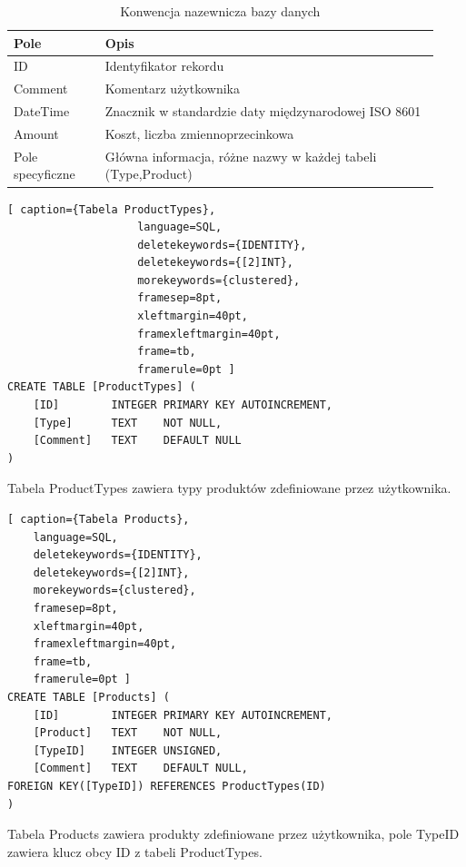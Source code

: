\documentclass[a4paper,10pt]{report}
\newcommand{\customstyletable}[1]{\footnotesize{\textbf{#1}}}
\begin{document}
\begin{table}[h]
    \footnotesize
    \begin{tabular}{|p{0.2\linewidth}|p{0.73\linewidth}|}  %
    \hline                  %
        
    \customstyletable{Pole} & \customstyletable{Opis} \\
    \hline
    {ID} & {Identyfikator rekordu}\\
    \hline
    {Comment} & {Komentarz użytkownika}\\
    \hline
    {DateTime} & {Znacznik w standardzie daty międzynarodowej ISO 8601 \cite{ISO 8601}}\\
    \hline
    {Amount} & {Koszt, liczba zmiennoprzecinkowa}\\
    \hline
    {Pole specyficzne} & {Główna informacja, różne nazwy w każdej tabeli (Type,Product)}\\
    \hline
    \end{tabular}
    \caption{Konwencja nazewnicza bazy danych }
\end{table}



\begin{lstlisting}[ caption={Tabela ProductTypes},
                    language=SQL,
                    deletekeywords={IDENTITY},
                    deletekeywords={[2]INT},
                    morekeywords={clustered},
                    framesep=8pt,
                    xleftmargin=40pt,
                    framexleftmargin=40pt,
                    frame=tb,
                    framerule=0pt ]
CREATE TABLE [ProductTypes] (
    [ID] 		INTEGER PRIMARY KEY AUTOINCREMENT,
    [Type] 		TEXT 	NOT NULL,
    [Comment] 	TEXT 	DEFAULT NULL
)
\end{lstlisting}
{Tabela ProductTypes zawiera typy produktów zdefiniowane przez użytkownika.}

\begin{lstlisting}[ caption={Tabela Products},
    language=SQL,
    deletekeywords={IDENTITY},
    deletekeywords={[2]INT},
    morekeywords={clustered},
    framesep=8pt,
    xleftmargin=40pt,
    framexleftmargin=40pt,
    frame=tb,
    framerule=0pt ]
CREATE TABLE [Products] (
    [ID]        INTEGER PRIMARY KEY AUTOINCREMENT,
    [Product]   TEXT    NOT NULL,
    [TypeID]	INTEGER UNSIGNED, 
    [Comment] 	TEXT    DEFAULT NULL,
FOREIGN KEY([TypeID]) REFERENCES ProductTypes(ID)
)
\end{lstlisting}
{Tabela Products zawiera produkty zdefiniowane przez użytkownika, pole TypeID 
zawiera klucz obcy ID z tabeli ProductTypes.}
\end{document}
